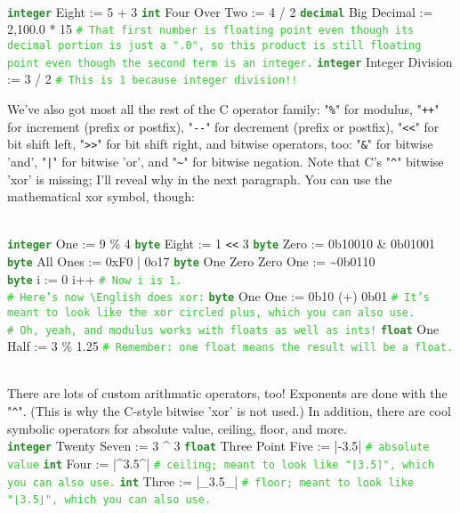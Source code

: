 \documentclass{article}
\newcommand{\name}{\textbackslash{}English}				%
\newcommand{\codecomment}[1]{\texttt{\textcolor{LimeGreen}{#1}}}
\newcommand{\commentline}[1]{\codecomment{\# #1}}
\newcommand{\type}[1]{\texttt{\textcolor{ForestGreen}{\textbf{#1}}}}
\newenvironment{code}[0]
{\ttfamily{}				%
\setlength\parindent{0cm}	%
~\\}
{\setlength\parindent{1cm}
~\\}
\begin{document}
\begin{code}
\type{integer} Eight := 5 + 3
\type{int} Four Over Two := 4 / 2
\type{decimal} Big Decimal := 2,100.0 * 15 \commentline{That first number is floating point even though its decimal portion is just a ".0", so this product is still floating point even though the second term is an integer.}
\type{integer} Integer Division := 3 / 2 \commentline{This is 1 because integer division!!}
\end{code}

\indent We've also got most all the rest of the C operator family: "\texttt{\%}" for modulus, "\texttt{++}" for increment (prefix or postfix), "\verb+--+" for decrement (prefix or postfix), "\verb+<<+" for bit shift left, "\verb+>>+" for bit shift right, and bitwise operators, too: "\texttt{\&}" for bitwise 'and', "\texttt{|}" for bitwise 'or', and "\texttt{\textasciitilde}" for bitwise negation.
\indent Note that C's "\texttt{\^}" bitwise 'xor' is missing; I'll reveal why in the next paragraph. You can use the mathematical xor symbol, though:

\begin{code}
\type{integer} One := 9 \% 4
\type{byte} Eight := 1 \verb+<<+ 3
\type{byte} Zero := 0b10010 \& 0b01001
\type{byte} All Ones := 0xF0 | 0o17
\type{byte} One Zero Zero One := \textasciitilde{}0b0110\\

\type{byte} i := 0
i++	\commentline{Now i is 1.}\\

\commentline{Here's now \name{} does xor:}
\type{byte} One One := 0b10 (+) 0b01 \commentline{It's meant to look like the xor circled plus, which you can also use.}\\

\commentline{Oh, yeah, and modulus works with floats as well as ints!}
\type{float} One Half := 3 \% 1.25	\commentline{Remember: one float means the result will be a float.}
\end{code}

\indent There are lots of custom arithmatic operators, too! Exponents are done with the "\texttt{\^}". (This is why the C-style bitwise 'xor' is not used.) In addition, there are cool symbolic operators for absolute value, ceiling, floor, and more.
\begin{code}
\type{integer} Twenty Seven := 3 \^{} 3
\type{float} Three Point Five := |-3.5|	\commentline{absolute value}
\type{int} Four := |\^{}3.5\^{}| \commentline{ceiling; meant to look like "⌈3.5⌉", which you can also use.}
\type{int} Three := |\_3.5\_| \commentline{floor; meant to look like "⌊3.5⌋", which you can also use.}
\end{code}
\end{document}
